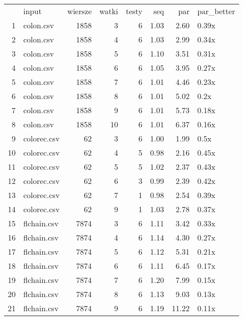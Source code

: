 \begin{table}[ht]
\centering
\begin{tabular}{rlrrrrrl}
  & input & wiersze & watki & testy & seq & par & par\_better \\ 
 1 & colon.csv & 1858 &   3 &   6 & 1.03 & 2.60 & 0.39x \\ 
   \hline
2 & colon.csv & 1858 &   4 &   6 & 1.03 & 2.99 & 0.34x \\ 
   \hline
3 & colon.csv & 1858 &   5 &   6 & 1.10 & 3.51 & 0.31x \\ 
   \hline
4 & colon.csv & 1858 &   6 &   6 & 1.05 & 3.95 & 0.27x \\ 
   \hline
5 & colon.csv & 1858 &   7 &   6 & 1.01 & 4.46 & 0.23x \\ 
   \hline
6 & colon.csv & 1858 &   8 &   6 & 1.01 & 5.02 & 0.2x \\ 
   \hline
7 & colon.csv & 1858 &   9 &   6 & 1.01 & 5.73 & 0.18x \\ 
   \hline
8 & colon.csv & 1858 &  10 &   6 & 1.01 & 6.37 & 0.16x \\ 
   \hline
9 & colorec.csv &  62 &   3 &   6 & 1.00 & 1.99 & 0.5x \\ 
   \hline
10 & colorec.csv &  62 &   4 &   5 & 0.98 & 2.16 & 0.45x \\ 
   \hline
11 & colorec.csv &  62 &   5 &   5 & 1.02 & 2.37 & 0.43x \\ 
   \hline
12 & colorec.csv &  62 &   6 &   3 & 0.99 & 2.39 & 0.42x \\ 
   \hline
13 & colorec.csv &  62 &   7 &   1 & 0.98 & 2.54 & 0.39x \\ 
   \hline
14 & colorec.csv &  62 &   9 &   1 & 1.03 & 2.78 & 0.37x \\ 
   \hline
15 & flchain.csv & 7874 &   3 &   6 & 1.11 & 3.42 & 0.33x \\ 
   \hline
16 & flchain.csv & 7874 &   4 &   6 & 1.14 & 4.30 & 0.27x \\ 
   \hline
17 & flchain.csv & 7874 &   5 &   6 & 1.12 & 5.31 & 0.21x \\ 
   \hline
18 & flchain.csv & 7874 &   6 &   6 & 1.11 & 6.45 & 0.17x \\ 
   \hline
19 & flchain.csv & 7874 &   7 &   6 & 1.20 & 7.99 & 0.15x \\ 
   \hline
20 & flchain.csv & 7874 &   8 &   6 & 1.13 & 9.03 & 0.13x \\ 
   \hline
21 & flchain.csv & 7874 &   9 &   6 & 1.19 & 11.22 & 0.11x \\ 

\end{tabular}
\end{table}
